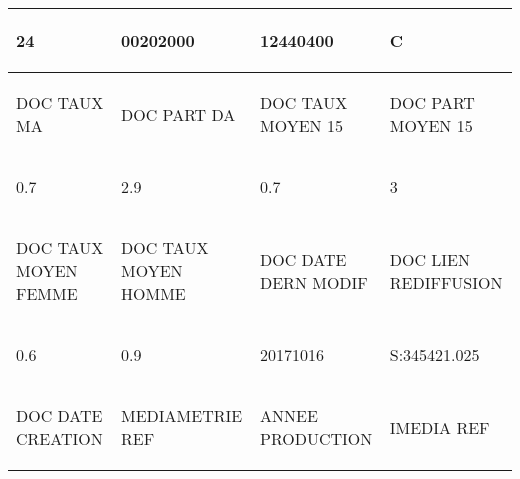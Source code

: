 \begin{table}
\begin{tabularx}{16cm}{|X|X|X|X|}
		 \begin{center}24\end{center}&\begin{center}00202000\end{center}&\begin{center}12440400\end{center}&\begin{center}C\end{center}  \tabularnewline \hline
		 \begin{center}DOC TAUX MA\end{center}&\begin{center}DOC PART DA\end{center}&\begin{center}DOC TAUX MOYEN 15\end{center}&\begin{center}DOC PART MOYEN 15\end{center}  \tabularnewline \hline
		 \begin{center}0.7\end{center}&\begin{center}2.9\end{center}&\begin{center}0.7\end{center}&\begin{center}3\end{center}  \tabularnewline \hline
		 \begin{center}DOC TAUX MOYEN FEMME\end{center}&\begin{center}DOC TAUX MOYEN HOMME\end{center}&\begin{center}DOC DATE DERN MODIF\end{center}&\begin{center}DOC LIEN REDIFFUSION\end{center}  \tabularnewline \hline
		 \begin{center}0.6\end{center}&\begin{center}0.9\end{center}&\begin{center}20171016\end{center}&\begin{center}S:345421.025\end{center}  \tabularnewline \hline
		 \begin{center}DOC DATE CREATION\end{center}&\begin{center}MEDIAMETRIE REF\end{center}&\begin{center}ANNEE PRODUCTION\end{center}&\begin{center}IMEDIA REF\end{center}  \tabularnewline \hline

\end{tabularx}
\end{table}
